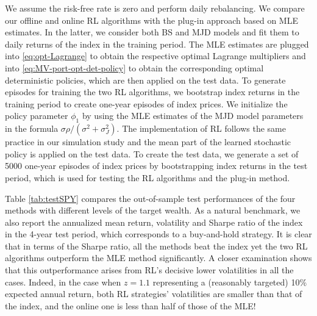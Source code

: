 \documentclass[11pt]{article}
\newcommand{\1}{\mathbbm{1}}
\begin{document}
We assume the risk-free rate is zero and perform daily rebalancing. We compare our offline and online RL algorithms with the plug-in approach based on MLE estimates. In the latter, we consider both BS and MJD models and fit them to daily returns of the index in the training period. The MLE estimates are plugged into \eqref{eq:opt-Lagrange} to obtain the respective optimal Lagrange multipliers and into \eqref{eq:MV-port-opt-det-policy} to obtain the corresponding optimal deterministic policies, which are then applied on the test data. To generate episodes for training the two RL algorithms, we bootstrap index returns in the training period to create one-year episodes of index prices. We initialize the policy parameter $\phi_1$ by using the MLE estimates of the MJD model parameters in the formula $\sigma\rho/(\sigma^2+\sigma_J^2)$. The implementation of RL follows the same practice in our simulation study and the mean part of the learned stochastic policy is applied on the test data. To create the test data, we generate a set of 5000 one-year episodes of index prices by bootstrapping index returns in the test period, which is used for testing the RL algorithms and the plug-in method.

Table \ref{tab:testSPY} compares the out-of-sample test performances of the four methods with different levels of the target wealth. As a natural benchmark, we also report the annualized mean return, volatility and Sharpe ratio of the index in the 4-year test period, which corresponds to a buy-and-hold strategy. It is clear
that in terms of the Sharpe ratio, all the methods beat the index yet the two  RL algorithms outperform the MLE method significantly. %
A closer examination shows that this outperformance arises from RL's decisive lower volatilities in all the cases. Indeed, in the case when
$z=1.1$ representing a (reasonably targeted) 10\% expected annual return, both RL strategies' volatilities are smaller than that of the index, and the online one is less than half of those of the MLE!

\color{black}
\end{document}
